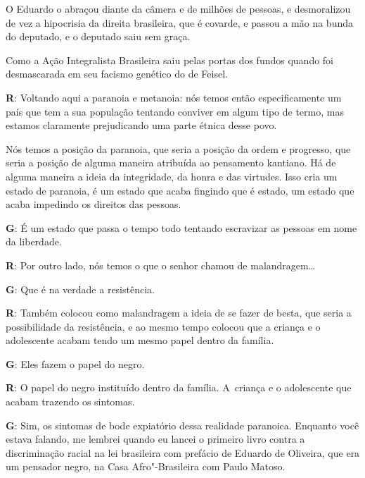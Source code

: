  

O Eduardo o abraçou diante da câmera e de milhões de pessoas, e
desmoralizou de vez a hipocrisia da direita brasileira, que é covarde, e
passou a mão na bunda do deputado, e o deputado saiu sem graça.

 

Como a Ação Integralista Brasileira saiu pelas portas dos fundos quando
foi desmascarada em seu facismo genético do  de Feisel.

 

\textbf{R}: Voltando aqui a paranoia e metanoia: nós temos então
especificamente um país que tem a sua população tentando conviver em
algum tipo de termo, mas estamos claramente prejudicando uma parte
étnica desse povo.

 

Nós temos a posição da paranoia, que seria a posição da ordem e
progresso, que seria a posição de alguma maneira atribuída ao pensamento
kantiano. Há de alguma maneira a ideia da integridade, da honra e das
virtudes. Isso cria um estado de paranoia, é um estado que acaba
fingindo que é estado, um estado que acaba impedindo os direitos das
pessoas.

 

\textbf{G}: É um estado que passa o tempo todo tentando escravizar as
pessoas em nome da liberdade.

 

\textbf{R}: Por outro lado, nós temos o que o senhor chamou de
malandragem…

 

\textbf{G}: Que é na verdade a resistência.

 

\textbf{R}: Também colocou como malandragem a ideia de se fazer de
besta, que seria a possibilidade da resistência, e ao mesmo tempo
colocou que a criança e o adolescente acabam tendo um mesmo papel dentro
da família.

 

\textbf{G}: Eles fazem o papel do negro.

 

\textbf{R}: O papel do negro instituído dentro da família. A~criança e o
adolescente que acabam trazendo os sintomas.

 

\textbf{G}: Sim, os sintomas de bode expiatório dessa realidade
paranoica. Enquanto você estava falando, me lembrei quando eu lancei o
primeiro livro contra a discriminação racial na lei brasileira com
prefácio de Eduardo de Oliveira, que era um pensador negro, na Casa
Afro"-Brasileira com Paulo Matoso.

